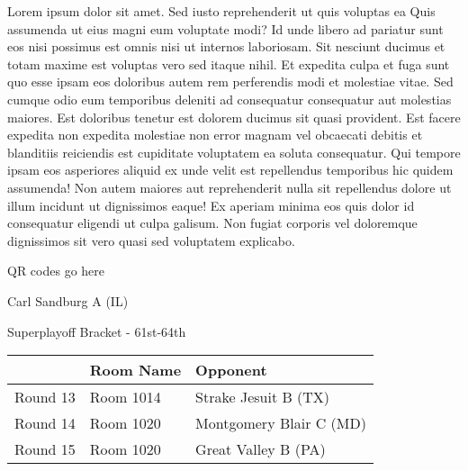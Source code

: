 \documentclass{article}%
\begin{document}
\vspace*{8pt}%
\linebreak%
\newline%
\newline%
Lorem ipsum dolor sit amet. Sed iusto reprehenderit ut quis voluptas ea Quis assumenda ut eius magni eum voluptate modi? Id unde libero ad pariatur sunt eos nisi possimus est omnis nisi ut internos laboriosam. Sit nesciunt ducimus et totam maxime est voluptas vero sed itaque nihil. Et expedita culpa et fuga sunt quo esse ipsam eos doloribus autem rem perferendis modi et molestiae vitae.\newline%
\newline%
Sed cumque odio eum temporibus deleniti ad consequatur consequatur aut molestias maiores. Est doloribus tenetur est dolorem ducimus sit quasi provident. Est facere expedita non expedita molestiae non error magnam vel obcaecati debitis et blanditiis reiciendis est cupiditate voluptatem ea soluta consequatur. Qui tempore ipsam eos asperiores aliquid ex unde velit est repellendus temporibus hic quidem assumenda!\newline%
\newline%
Non autem maiores aut reprehenderit nulla sit repellendus dolore ut illum incidunt ut dignissimos eaque! Ex aperiam minima eos quis dolor id consequatur eligendi ut culpa galisum. Non fugiat corporis vel doloremque dignissimos sit vero quasi sed voluptatem explicabo.\newline%
\newline%
%
\vspace*{30pt}%
\begin{center}%
\begin{Huge}%
QR codes go here%
\end{Huge}%
\end{center}%
\newpage%
\begin{center}%
\begin{Huge}%
Carl Sandburg A (IL)%
\end{Huge}%
\vspace*{8pt}%
\linebreak%
\begin{Large}%
Superplayoff Bracket {-} 61st{-}64th%
\end{Large}%
\end{center}%
%
\begin{tabularx}{\textwidth}{|c|Y|Y|}%
\hline%
&Room Name&Opponent\\%
\hline%
Round 13&Room 1014&Strake Jesuit B (TX)\\%
Round 14&Room 1020&Montgomery Blair C (MD)\\%
Round 15&Room 1020&Great Valley B (PA)\\%
\hline%
\end{tabularx}%
\end{document}

